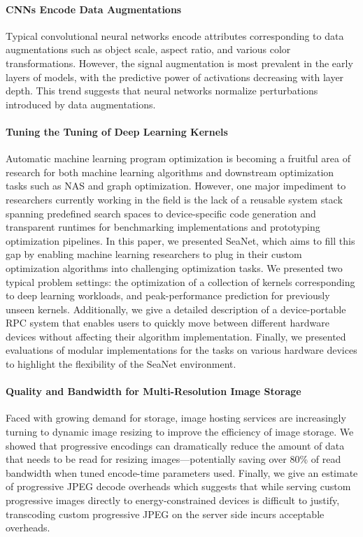 \paragraph{CNNs Encode Data Augmentations}
Typical convolutional neural networks encode attributes corresponding to data augmentations such as object scale, aspect ratio, and various color transformations.
However, the signal augmentation is most prevalent in the early layers of models, with the predictive power of activations decreasing with layer depth.
This trend suggests that neural networks normalize perturbations introduced by data augmentations.

\paragraph{Tuning the Tuning of Deep Learning Kernels}
Automatic machine learning program optimization is becoming a fruitful area of research for both machine learning algorithms and downstream optimization tasks such as NAS and graph optimization.
However, one major impediment to researchers currently working in the field is the lack of a reusable system stack spanning predefined search spaces to device-specific code generation and transparent runtimes for benchmarking implementations and prototyping optimization pipelines.
In this paper, we presented SeaNet, which aims to fill this gap by enabling machine learning researchers to plug in their custom optimization algorithms into challenging optimization tasks.
We presented two typical problem settings: the optimization of a collection of kernels corresponding to deep learning workloads, and peak-performance prediction for previously unseen kernels.
Additionally, we give a detailed description of a device-portable RPC system that enables users to quickly move between different hardware devices without affecting their algorithm implementation.
Finally, we presented evaluations of modular implementations for the tasks on various hardware devices to highlight the flexibility of the SeaNet environment.

\paragraph{Quality and Bandwidth for Multi-Resolution Image Storage}
Faced with growing demand for storage, image hosting services are increasingly turning to dynamic image resizing to improve the efficiency of image storage.
We showed that progressive encodings can dramatically reduce the amount of data that needs to be read for resizing images---potentially saving over 80\% of read bandwidth when tuned encode-time parameters used.
Finally, we give an estimate of progressive JPEG decode overheads which suggests that while serving custom progressive images directly to energy-constrained devices is difficult to justify, transcoding custom progressive JPEG on the server side incurs acceptable overheads.

